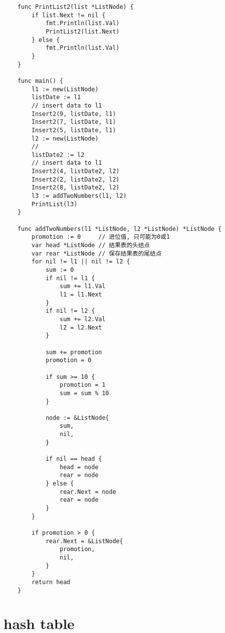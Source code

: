 \documentclass[oneside,12pt,twiside,a4paper]{ctexbook}
\begin{document}
\begin{lstlisting}
    func PrintList2(list *ListNode) {
        if list.Next != nil {
            fmt.Println(list.Val)
            PrintList2(list.Next)
        } else {
            fmt.Println(list.Val)
        }
    }
    
    func main() {
        l1 := new(ListNode)
        listDate := l1
        // insert data to l1
        Insert2(9, listDate, l1)
        Insert2(7, listDate, l1)
        Insert2(5, listDate, l1)
        l2 := new(ListNode)
        //
        listDate2 := l2
        // insert data to l1
        Insert2(4, listDate2, l2)
        Insert2(2, listDate2, l2)
        Insert2(8, listDate2, l2)
        l3 := addTwoNumbers(l1, l2)
        PrintList(l3)
    }
    
    func addTwoNumbers(l1 *ListNode, l2 *ListNode) *ListNode {
        promotion := 0     // 进位值, 只可能为0或1
        var head *ListNode // 结果表的头结点
        var rear *ListNode // 保存结果表的尾结点
        for nil != l1 || nil != l2 {
            sum := 0
            if nil != l1 {
                sum += l1.Val
                l1 = l1.Next
            }
            if nil != l2 {
                sum += l2.Val
                l2 = l2.Next
            }
    
            sum += promotion
            promotion = 0
    
            if sum >= 10 {
                promotion = 1
                sum = sum % 10
            }
    
            node := &ListNode{
                sum,
                nil,
            }
    
            if nil == head {
                head = node
                rear = node
            } else {
                rear.Next = node
                rear = node
            }
        }
    
        if promotion > 0 {
            rear.Next = &ListNode{
                promotion,
                nil,
            }
        }
        return head
    }    
\end{lstlisting}

%
\chapter{hash table}
\end{document}
